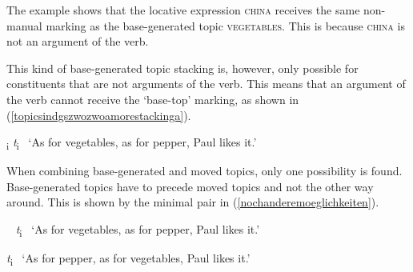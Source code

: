 \noindent The example shows that the locative expression \textsc{china} receives the same non-manual marking as the base-generated topic \textsc{vegetables}. This is because \textsc{china} is not an argument of the verb. %

This kind of base-generated topic stacking is, however, only possible for constituents that are not arguments of the verb. This means that an argument of the verb cannot receive the `base-top' marking, as shown in (\ref{topicsindgszwozwoamorestackinga}). 

\begin{exe} 
\ex * \textsubscript{\textup{i}} \textit{t}\textsubscript{i} 
\glt \textcolor{white}{*}`As for vegetables, as for pepper, Paul likes it.' \label{topicsindgszwozwoamorestackinga}
\end{exe}

\newpage 
\noindent When combining base-generated and moved topics, only one possibility is found. Base-generated topics have to precede moved topics and not the other way around. This is shown by the minimal pair in (\ref{nochanderemoeglichkeiten}).

\begin{exe} 
\ex\label{nochanderemoeglichkeiten}\begin{xlist}
\ex \textcolor{white}{*}   \textit{t}\textsubscript{i} 
%
\glt \textcolor{white}{*}`As for vegetables, as for pepper, Paul likes it.' \label{nochanderemoeglichkeitena}

\ex *   \textit{t}\textsubscript{i} 
%
\glt \textcolor{white}{*}`As for pepper, as for vegetables, Paul likes it.' \label{nochanderemoeglichkeitenb}

\end{xlist}
\end{exe}

